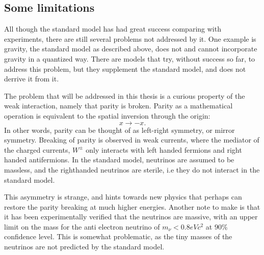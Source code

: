 \subsection*{Some limitations}
All though the standard model has had great success comparing with experiments,
there are still several problems not addressed by it. One example is gravity, the standard model
as described above, does not and cannot incorporate gravity in a quantized way. There 
are models that try, without success so far, to address this problem, but they supplement the standard model,
and does not derrive it from it. \par 
The problem that will be addressed in this thesis is a curious property of the weak interaction, 
namely that parity is broken. Parity as a mathematical operation is equivalent to the spatial inversion 
through the origin\cite{Thomson:2013zua}:
\begin{equation}
    x \to -x.
\end{equation}
In other words, parity can be thought of as left-right symmetry, or mirror symmetry. Breaking of parity is observed
in weak currents, where the mediator of the charged currents, $W^{\pm}$ only interacts with 
left handed fermions and right handed antifermions. In the standard model, neutrinos are assumed to be massless, and the righthanded 
neutrinos are sterile, i.e they do not interact in the standard model. \par 
This asymmetry is strange, and hints towards new physics that perhaps can restore the parity breaking at much higher energies. 
Another note to make is that it has been experimentally verified that the neutrinos are massive\cite{Katrin_neutrinos},
with an upper limit on the mass for the anti electron neutrino of $m_{\nu} < 0.8eVc^2$ at $90\%$ confidence level.
This is somewhat problematic, as the tiny masses of the neutrinos are not predicted by the standard model. 









